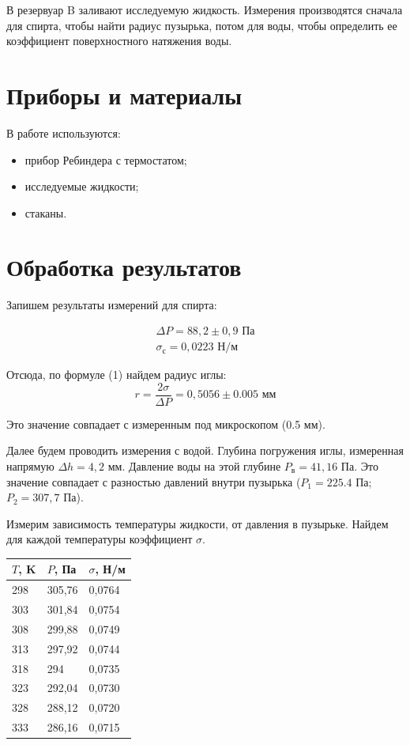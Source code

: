 \documentclass[12pt]{article}
\begin{document}
В резервуар B заливают исследуемую жидкость. Измерения производятся сначала для спирта, чтобы найти радиус пузырька, потом для воды, чтобы определить ее коэффициент поверхностного натяжения воды.

\section{Приборы и материалы}

В работе используются:

\begin{itemize}
	\item прибор Ребиндера с термостатом;
	\item исследуемые жидкости;
	\item стаканы.
\end{itemize}

\section{Обработка результатов}

Запишем результаты измерений для спирта:

\begin{align*}
	\Delta P = 88,2 \pm 0,9 \text{ Па}\\
	\sigma_\text{с} = 0,0223 \text{ Н/м}
\end{align*}

Отсюда, по формуле (1) найдем радиус иглы:
\begin{equation*}
	r = \frac{2\sigma}{\Delta P} = 0,5056 \pm 0.005 \text{ мм}
\end{equation*}

Это значение совпадает с измеренным под микроскопом (0.5 мм).

Далее будем проводить измерения с водой. Глубина погружения иглы, измеренная напрямую $\Delta h = 4,2$ мм. Давление воды на этой глубине $P_\text{в} = 41,16$ Па. Это значение совпадает с разностью давлений внутри пузырька ($P_1 = 225.4$ Па; $P_2 = 307,7$ Па). 

Измерим зависимость температуры жидкости, от давления в пузырьке. Найдем для каждой температуры коэффициент $\sigma$.

\begin{table}[H]
	\centering
	\begin{tabular}{|l|l|l|}
		\hline
		$T$, K & $P$, Па & $\sigma$, Н/м \\ \hline
		298    & 305,76  & 0,0764       \\ \hline
		303    & 301,84  & 0,0754       \\ \hline
		308    & 299,88  & 0,0749       \\ \hline
		313    & 297,92  & 0,0744       \\ \hline
		318    & 294     & 0,0735       \\ \hline
		323    & 292,04  & 0,0730       \\ \hline
		328    & 288,12  & 0,0720       \\ \hline
		333    & 286,16  & 0,0715       \\ \hline
	\end{tabular}
\end{table} 
\end{document}
